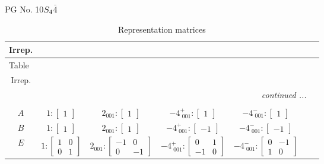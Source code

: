 \documentclass[fleqn,8pt,landscape]{jsarticle}
\begin{document}
\setcounter{MaxMatrixCols}{32}

\renewcommand{\tablename}{Table~}
\renewcommand{\figurename}{Figure~}
\begin{center}
\LARGE
PG No. 10\quad$S_{\rm 4}$\quad$\bar{4}$\quad[ tetragonal ]
\end{center}
\renewcommand{\arraystretch}{1.2}
\begin{longtable}{ccccccc}
\caption{Representation matrices}
 \\
 \hline \hline
Irrep. &  &  &  &  &  &  \\ \hline \endfirsthead

\multicolumn{6}{l}{\tablename\ \thetable{}} \\
 \hline \hline
Irrep. &  &  &  &  &  &  \\ \hline \endhead

 \hline \hline
\multicolumn{6}{r}{\footnotesize\it continued ...} \\ \endfoot

 \hline \hline
\multicolumn{6}{r}{} \\ \endlastfoot

$ A $ & $ 1:\begin{bmatrix} 1 \end{bmatrix} $ & $ 2{}_{001}:\begin{bmatrix} 1 \end{bmatrix} $ & $ -4^{+}_{\,\,001}:\begin{bmatrix} 1 \end{bmatrix} $ & $ -4^{-}_{\,\,001}:\begin{bmatrix} 1 \end{bmatrix} $ \\ \hline
$ B $ & $ 1:\begin{bmatrix} 1 \end{bmatrix} $ & $ 2{}_{001}:\begin{bmatrix} 1 \end{bmatrix} $ & $ -4^{+}_{\,\,001}:\begin{bmatrix} -1 \end{bmatrix} $ & $ -4^{-}_{\,\,001}:\begin{bmatrix} -1 \end{bmatrix} $ \\ \hline
$ E $ & $ 1:\begin{bmatrix} 1 & 0 \\ 0 & 1 \end{bmatrix} $ & $ 2{}_{001}:\begin{bmatrix} -1 & 0 \\ 0 & -1 \end{bmatrix} $ & $ -4^{+}_{\,\,001}:\begin{bmatrix} 0 & 1 \\ -1 & 0 \end{bmatrix} $ & $ -4^{-}_{\,\,001}:\begin{bmatrix} 0 & -1 \\ 1 & 0 \end{bmatrix} $ \\
\end{longtable}
\end{document}
